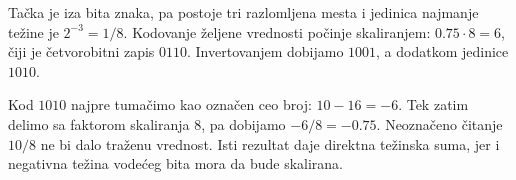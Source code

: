 
Tačka je iza bita znaka, pa postoje tri razlomljena mesta i jedinica najmanje težine je $2^{-3}=1/8$. Kodovanje željene vrednosti počinje skaliranjem: $0.75\cdot8=6$, čiji je četvorobitni zapis $0110$. Invertovanjem dobijamo $1001$, a dodatkom jedinice $1010$.

Kod $1010$ najpre tumačimo kao označen ceo broj: $10-16=-6$. Tek zatim delimo sa faktorom skaliranja $8$, pa dobijamo $-6/8=-0.75$. Neoznačeno čitanje $10/8$ ne bi dalo traženu vrednost. Isti rezultat daje direktna težinska suma, jer i negativna težina vodećeg bita mora da bude skalirana.
